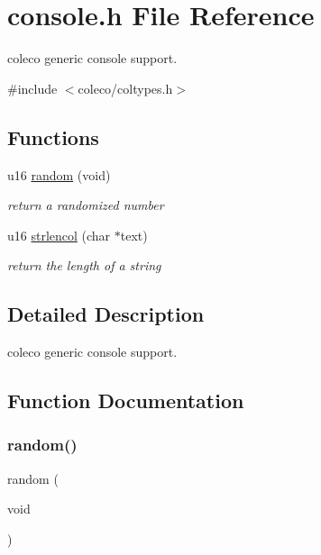 \hypertarget{a00047}{}\section{console.\+h File Reference}
\label{a00047}


coleco generic console support.  


{\ttfamily \#include $<$coleco/coltypes.\+h$>$}\newline
\subsection*{Functions}
\begin{DoxyCompactItemize}
\item 
u16 \hyperlink{a00047_a9f25e80dcc900af7cc041bad177fd312}{random} (void)
\begin{DoxyCompactList}\small\item\em return a randomized number \end{DoxyCompactList}\item 
u16 \hyperlink{a00047_a13706944b8c204cb91753180f914c63c}{strlencol} (char $\ast$text)
\begin{DoxyCompactList}\small\item\em return the length of a string \end{DoxyCompactList}\end{DoxyCompactItemize}


\subsection{Detailed Description}
coleco generic console support. 



\subsection{Function Documentation}
\mbox{\label{a00047_a9f25e80dcc900af7cc041bad177fd312}} 
\subsubsection{\texorpdfstring{random()}{random()}}
{\footnotesize\ttfamily random (\begin{DoxyParamCaption}\item[{void}]{ }\end{DoxyParamCaption})}



